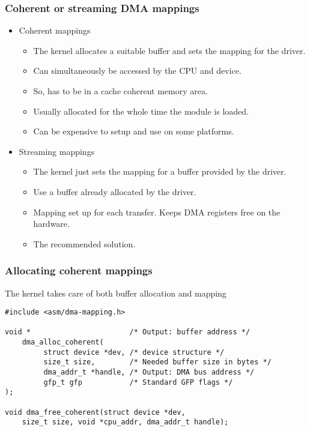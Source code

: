 \begin{frame}
  \frametitle{Coherent or streaming DMA mappings}
  \begin{itemize}
  \item Coherent mappings
    \begin{itemize}
    \item The kernel allocates a suitable buffer and sets the mapping
      for the driver.
    \item Can simultaneously be accessed by the CPU and device.
    \item So, has to be in a cache coherent memory area.
    \item Usually allocated for the whole time the module is loaded.
    \item Can be expensive to setup and use on some platforms.
    \end{itemize}
  \item Streaming mappings
    \begin{itemize}
    \item The kernel just sets the mapping for a buffer provided by
      the driver.
    \item Use a buffer already allocated by the driver.
    \item Mapping set up for each transfer. Keeps DMA registers free
      on the hardware.
    \item The recommended solution.
    \end{itemize}
  \end{itemize}
\end{frame}

\begin{frame}[fragile]
  \frametitle{Allocating coherent mappings}
  The kernel takes care of both buffer allocation and mapping
\begin{verbatim}
#include <asm/dma-mapping.h>

void *                       /* Output: buffer address */
    dma_alloc_coherent(
         struct device *dev, /* device structure */
         size_t size,        /* Needed buffer size in bytes */
         dma_addr_t *handle, /* Output: DMA bus address */
         gfp_t gfp           /* Standard GFP flags */
);

void dma_free_coherent(struct device *dev,
    size_t size, void *cpu_addr, dma_addr_t handle);
\end{verbatim}
\end{frame}

